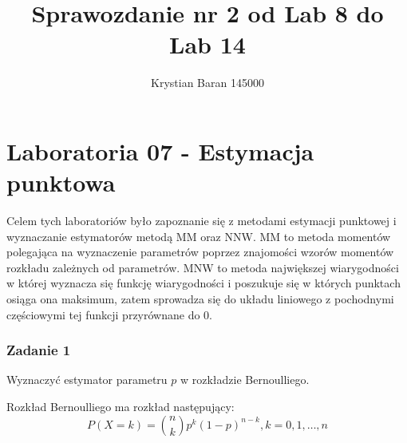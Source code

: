 \documentclass{article}
\author{Krystian Baran 145000}
\title{Sprawozdanie nr 2 od Lab 8 do Lab 14}
\begin{document}
\maketitle
\newpage

\tableofcontents
\newpage

\part{Laboratoria 07 - Estymacja punktowa}

Celem tych laboratoriów było zapoznanie się z metodami estymacji punktowej i wyznaczanie estymatorów metodą MM oraz NNW. MM to metoda momentów polegająca na wyznaczenie parametrów poprzez znajomości wzorów momentów rozkładu zależnych od parametrów. MNW to metoda największej wiarygodności w której wyznacza się funkcję wiarygodności i poszukuje się w których punktach osiąga ona maksimum, zatem sprowadza się do układu liniowego z pochodnymi częściowymi tej funkcji przyrównane do 0.

\section{Zadanie 1}
Wyznaczyć estymator parametru $p$ w rozkładzie Bernoulliego. \\ \par

Rozkład Bernoulliego ma rozkład następujący:
\[ P(X=k) = \binom{n}{k} p^k(1-p)^{n-k}, k = 0,1,\dots,n \]
\end{document}

